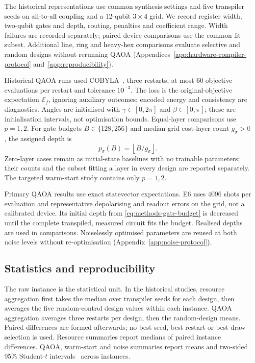 \documentclass[a4paper,onecolumn,11pt,unpublished]{quantumarticle}
\theoremstyle{remark}
\begin{document}
The historical representations use common synthesis settings and five transpiler seeds
on all-to-all coupling and a 12-qubit $3\times4$ grid. We record register
width, two-qubit gates and depth, routing, penalties and coefficient range.
Width failures are recorded separately; paired device comparisons use the
common-fit subset. Additional line, ring and heavy-hex comparisons evaluate
selective and random designs without rerunning QAOA
(Appendices~\ref{app:hardware-compiler-protocol} and~\ref{app:reproducibility}).

Historical QAOA runs used COBYLA~\cite{Powell1994},
three restarts,
at most 60 objective evaluations per restart and tolerance $10^{-3}$.
The loss is the original-objective expectation $\mathcal E_f$, ignoring
auxiliary outcomes; encoded energy and consistency are diagnostics.
Angles are initialised with $\gamma\in[0,2\pi]$ and $\beta\in[0,\pi]$;
these are initialisation intervals, not optimisation bounds. Equal-layer
comparisons use $p=1,2$. For gate budgets $B\in\{128,256\}$ and median
grid cost-layer count $g_\sigma>0$, the assigned depth is
\begin{equation}
 p_\sigma(B)=\left\lfloor B/g_\sigma\right\rfloor.
 \label{eq:methods-gate-budget}
\end{equation}
Zero-layer cases remain as initial-state baselines with no trainable
parameters; their counts and the subset fitting a layer in every design are
reported separately. The targeted warm-start study contains only $p=1,2$.

Primary QAOA results use exact statevector expectations. E6 uses 4096 shots
per evaluation and representative depolarising and readout errors on the grid,
not a calibrated device. Its initial depth from
\cref{eq:methods-gate-budget} is decreased until the complete transpiled,
measured circuit fits the budget. Realised depths are used in comparisons.
Noiselessly optimised parameters are reused at both noise levels without
re-optimisation (Appendix~\ref{app:noise-protocol}).

\subsection{Statistics and reproducibility}
\label{sec:statistics-reproducibility}

The raw instance is the statistical unit. In the historical studies, resource aggregation first takes
the median over transpiler seeds for each design, then averages the five
random-control design values within each instance. QAOA aggregation averages
three restarts per design, then the random-design means. Paired differences
are formed afterwards; no best-seed, best-restart or best-draw selection is
used. Resource summaries report medians of paired instance differences.
QAOA, warm-start and noise summaries report means and two-sided 95\%
Student-$t$ intervals~\cite{Student1908} across instances.
\end{document}
